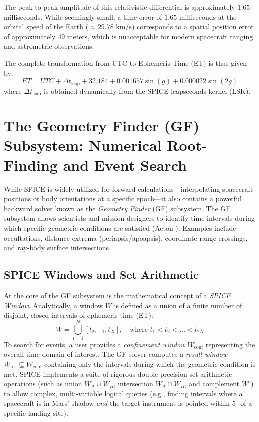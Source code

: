 \documentclass{acta}
\begin{document}
The peak-to-peak amplitude of this relativistic differential is approximately $1.65$ milliseconds. While seemingly small, a time error of $1.65$ milliseconds at the orbital speed of the Earth ($\approx 29.78\text{ km/s}$) corresponds to a spatial position error of approximately $49\text{ meters}$, which is unacceptable for modern spacecraft ranging and astrometric observations.

The complete transformation from UTC to Ephemeris Time (ET) is thus given by:
\begin{equation}
ET = UTC + \Delta t_{\text{leap}} + 32.184 + 0.001657 \sin(g) + 0.000022 \sin(2g)
\end{equation}
where $\Delta t_{\text{leap}}$ is obtained dynamically from the SPICE leapseconds kernel (LSK).

\section{The Geometry Finder (GF) Subsystem: Numerical Root-Finding and Event Search}
While SPICE is widely utilized for forward calculations---interpolating spacecraft positions or body orientations at a specific epoch---it also contains a powerful backward solver known as the {\it Geometry Finder} (GF) subsystem. The GF subsystem allows scientists and mission designers to identify time intervals during which specific geometric conditions are satisfied (Acton ). Examples include occultations, distance extrema (periapsis/apoapsis), coordinate range crossings, and ray-body surface intersections.

\subsection{SPICE Windows and Set Arithmetic}
At the core of the GF subsystem is the mathematical concept of a {\it SPICE Window}. Analytically, a window $W$ is defined as a union of a finite number of disjoint, closed intervals of ephemeris time (ET):
\begin{equation}
W = \bigcup_{i=1}^{N} [t_{2i-1}, t_{2i}], \quad \text{where } t_1 < t_2 < \dots < t_{2N}
\end{equation}
To search for events, a user provides a {\it confinement window} $W_{\text{conf}}$ representing the overall time domain of interest. The GF solver computes a {\it result window} $W_{\text{res}} \subseteq W_{\text{conf}}$ containing only the intervals during which the geometric condition is met. SPICE implements a suite of rigorous double-precision set arithmetic operations (such as union $W_A \cup W_B$, intersection $W_A \cap W_B$, and complement $W^c$) to allow complex, multi-variable logical queries (e.g., finding intervals where a spacecraft is in Mars' shadow {\it and} the target instrument is pointed within $5^\circ$ of a specific landing site).
\end{document}
